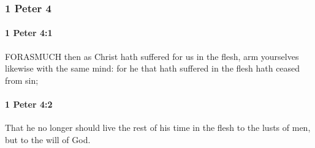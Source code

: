 	\subsubsection{1 Peter 4} %
		\label{1PETER-4}
		
		\paragraph{1 Peter 4:1} %
			\label{1PETER-4-1}

			FORASMUCH then as Christ hath suffered for us in the flesh, arm yourselves likewise with the same mind: for he that hath suffered in the flesh hath ceased from sin;

			\begin{framed}
			\scriptsize
				\begin{compactdesc}
					\item[SBLG] 
				\end{compactdesc}
			\end{framed}

		\paragraph{1 Peter 4:2} %
			\label{1PETER-4-2}

			That he no longer should live the rest of his time in the flesh to the lusts of men, but to the will of God.

